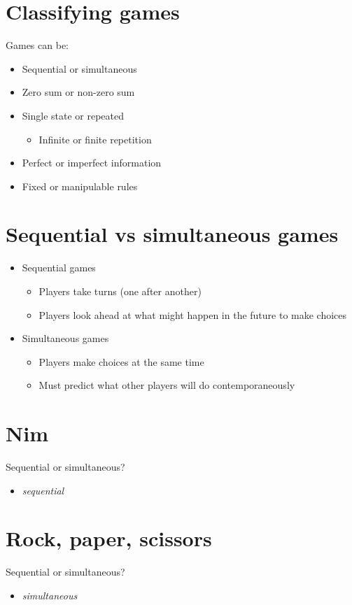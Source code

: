 \documentclass[11pt]{article}
\begin{document}
\section*{Classifying games}
\label{sec:org071fab4}
Games can be:
\begin{itemize}
\item Sequential or simultaneous
\item Zero sum or non-zero sum
\item Single state or repeated
\begin{itemize}
\item Infinite or finite repetition
\end{itemize}
\item Perfect or imperfect information
\item Fixed or manipulable rules
\end{itemize}

\section*{Sequential vs simultaneous games}
\label{sec:org9601acc}
\begin{itemize}
\item Sequential games
\begin{itemize}
\item Players take turns (one after another)
\item Players look ahead at what might happen in the future to make choices
\end{itemize}
\item Simultaneous games
\begin{itemize}
\item Players make choices at the same time
\item Must predict what other players will do contemporaneously
\end{itemize}
\end{itemize}

\section*{Nim}
\label{sec:org62c9eac}
Sequential or simultaneous?
\begin{itemize}
\item \emph{sequential}
\end{itemize}

\section*{Rock, paper, scissors}
\label{sec:org57a4271}
Sequential or simultaneous?
\begin{itemize}
\item \emph{simultaneous}
\end{itemize}
\end{document}
